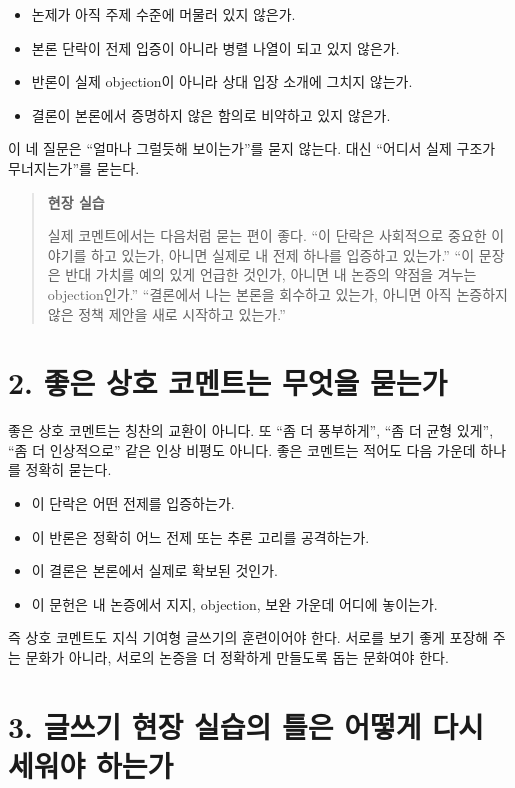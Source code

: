 \begin{itemize}
\tightlist
\item
  논제가 아직 주제 수준에 머물러 있지 않은가.
\item
  본론 단락이 전제 입증이 아니라 병렬 나열이 되고 있지 않은가.
\item
  반론이 실제 objection이 아니라 상대 입장 소개에 그치지 않는가.
\item
  결론이 본론에서 증명하지 않은 함의로 비약하고 있지 않은가.
\end{itemize}

이 네 질문은 ``얼마나 그럴듯해 보이는가''를 묻지 않는다. 대신 ``어디서 실제 구조가 무너지는가''를 묻는다.

\begin{quote}
\textbf{현장 실습}

실제 코멘트에서는 다음처럼 묻는 편이 좋다. ``이 단락은 사회적으로 중요한 이야기를 하고 있는가, 아니면 실제로 내 전제 하나를 입증하고 있는가.'' ``이 문장은 반대 가치를 예의 있게 언급한 것인가, 아니면 내 논증의 약점을 겨누는 objection인가.'' ``결론에서 나는 본론을 회수하고 있는가, 아니면 아직 논증하지 않은 정책 제안을 새로 시작하고 있는가.''
\end{quote}

\section{2. 좋은 상호 코멘트는 무엇을 묻는가}\label{2-uxc88buxc740-uxc0c1uxd638-uxcf54uxba58uxd2b8uxb294-uxbb34uxc5c7uxc744-uxbb3buxb294uxac00}

좋은 상호 코멘트는 칭찬의 교환이 아니다. 또 ``좀 더 풍부하게'', ``좀 더 균형 있게'', ``좀 더 인상적으로'' 같은 인상 비평도 아니다. 좋은 코멘트는 적어도 다음 가운데 하나를 정확히 묻는다.

\begin{itemize}
\tightlist
\item
  이 단락은 어떤 전제를 입증하는가.
\item
  이 반론은 정확히 어느 전제 또는 추론 고리를 공격하는가.
\item
  이 결론은 본론에서 실제로 확보된 것인가.
\item
  이 문헌은 내 논증에서 지지, objection, 보완 가운데 어디에 놓이는가.
\end{itemize}

즉 상호 코멘트도 지식 기여형 글쓰기의 훈련이어야 한다. 서로를 보기 좋게 포장해 주는 문화가 아니라, 서로의 논증을 더 정확하게 만들도록 돕는 문화여야 한다.

\section{3. 글쓰기 현장 실습의 틀은 어떻게 다시 세워야 하는가}\label{3-uxae00uxc4f0uxae30-uxd604uxc7a5-uxc2e4uxc2b5uxc758-uxd2c0uxc740-uxc5b4uxb5bbuxac8c-uxb2e4uxc2dc-uxc138uxc6ccuxc57c-uxd558uxb294uxac00}

